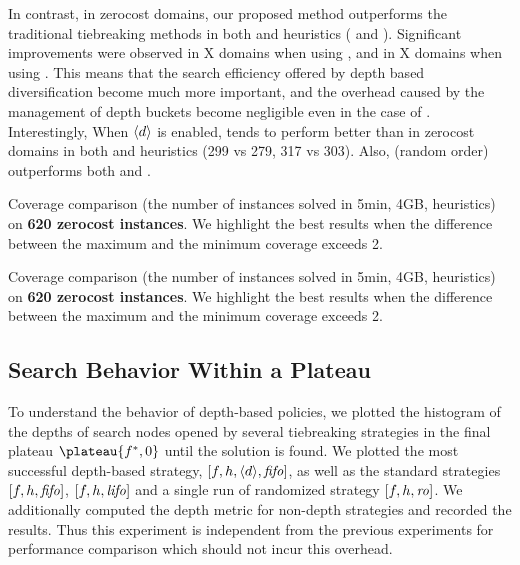 
In contrast, 
in zerocost domains, our proposed method outperforms the traditional
tiebreaking methods in both \lmcut and \mands heuristics
( and ).
Significant improvements were observed in X domains when using \lmcut,
and in X domains when using \mands.
This means that the search efficiency offered by depth based diversification
become much more important, and the overhead caused
by the management of depth buckets become negligible even in the case of \mands.
Interestingly, When ${\left<d\right>}$ is enabled, \fifo tends to perform better
than \lifo in
zerocost domains in both \lmcut and \mands heuristics (299 vs 279, 317
vs 303). Also, \ro (random order) outperforms both \fifo and \lifo.

\begin{table}[htbp]
 {
 \centering
 
  \caption{
 Coverage comparison (the number of instances solved in 5min, 4GB, \lmcut heuristics) 
 on \textbf{620 zerocost instances}. We highlight the
 best results when the difference between the maximum and the minimum coverage exceeds 2.
 }
 \label{tbl:lmcut-zerocost-full}
 }
\end{table}

\begin{table}[htbp]
 {
 \centering
 
  \caption{
 Coverage comparison (the number of instances solved in 5min, 4GB, \mands heuristics)
 on \textbf{620 zerocost instances}. We highlight the
 best results when the difference between the maximum and the minimum coverage exceeds 2.
 }
 \label{tbl:mands-zerocost-full}
 }
\end{table}

\clearpage

\subsection{Search Behavior Within a Plateau}

To understand the behavior of depth-based policies, we plotted the
histogram of the depths of search nodes opened by several tiebreaking
strategies in the final plateau $\plateau{f^*,0}$ until the solution is
found.  We plotted the most successful depth-based strategy,
$[f,h,{\left<d\right>},{\text{\textit{fifo}}}]$, as well as the standard strategies $[f,h,{\text{\textit{fifo}}}]$,
$[f,h,{\text{\textit{lifo}}}]$ and a single run of randomized strategy $[f,h,{\text{\textit{ro}}}]$.
We additionally computed the depth metric for non-depth strategies and
recorded the results. Thus this experiment is independent from the
previous experiments for performance comparison which should not incur
this overhead.



